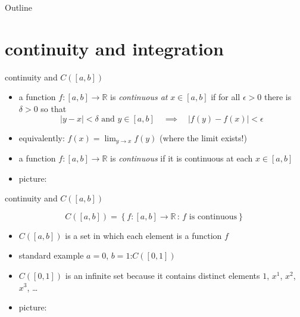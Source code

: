 \documentclass[10pt,
               svgnames,
               hyperref={colorlinks,citecolor=DeepPink4,linkcolor=FireBrick,urlcolor=Maroon},
               usepdftitle=false]{beamer}
\newcommand{\RR}{\mathbb{R}}
\newcommand{\eps}{\epsilon}
\newcommand{\ds}{\displaystyle}
\begin{document}
\begin{frame}{Outline}
  \tableofcontents[hideallsubsections]
\end{frame}

\AtBeginSection[]
{%
}

\section{continuity and integration}


\begin{frame}{continuity and $C([a,b])$}

\begin{definition}[continuity]
\begin{itemize}
\item a function $f:[a,b] \to \RR$ is \emph{continuous at} $x\in[a,b]$ if for all $\eps>0$ there is $\delta>0$ so that
  $$|y-x|<\delta \text{ and } y\in[a,b] \quad \implies \quad |f(y)-f(x)|<\eps$$
\item equivalently: \quad $\ds f(x) = \lim_{y\to x} f(y)$ \quad (where the limit exists!)
\item a function $f:[a,b] \to \RR$ is \emph{continuous} if it is continuous at each $x\in[a,b]$
\end{itemize}
\end{definition}

\begin{itemize}
\item picture:

\vspace{30mm}
\end{itemize}
\end{frame}


\begin{frame}{continuity and $C([a,b])$}

\begin{definition}
   $$C([a,b]) = \left\{f:[a,b] \to \RR \,:\, f \text{ is continuous}\right\}$$
\end{definition}

\begin{itemize}
\item $C([a,b])$ is a set in which each element is a function $f$
\item standard example $a=0$, $b=1$:\quad  $C([0,1])$
\item $C([0,1])$ is an infinite set because it contains distinct elements $1$, $x^1$, $x^2$, $x^3$, \dots

\item picture:

\vspace{30mm}
\end{itemize}

\end{frame}
\end{document}
